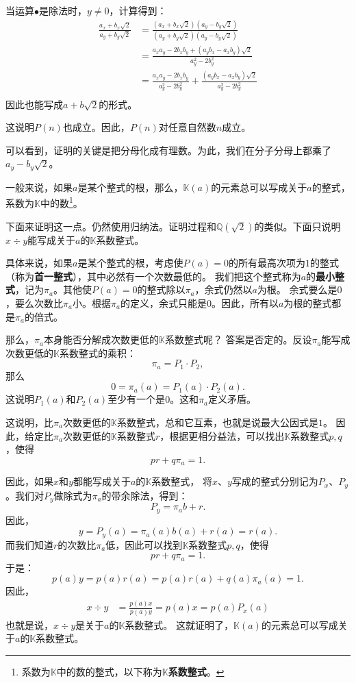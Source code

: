 \documentclass[12pt,UTF8]{ctexbook}
\theoremstyle{definition}
\theoremstyle{plain}
\begin{document}
当运算$\bullet$是除法时，$y\neq 0$，计算得到：
\begin{align*}
    \frac{a_x + b_x\sqrt{2}}{a_y + b_y\sqrt{2}} &=  \frac{(a_x + b_x\sqrt{2})(a_y - b_y\sqrt{2})}{(a_y + b_y\sqrt{2})(a_y - b_y\sqrt{2})} \\
    &= \frac{a_xa_y - 2b_xb_y + (a_yb_x - a_xb_y)\sqrt{2}}{a_y^2 - 2b_y^2} \\
    &= \frac{a_xa_y - 2b_xb_y}{a_y^2 - 2b_y^2} + \frac{(a_yb_x - a_xb_y)\sqrt{2}}{a_y^2 - 2b_y^2}\\
\end{align*}
因此也能写成$a + b\sqrt{2}$的形式。

这说明$P(n)$也成立。因此，$P(n)$对任意自然数$n$成立。

可以看到，证明的关键是把分母化成有理数。为此，我们在分子分母上都乘了$a_y - b_y\sqrt{2}$。

一般来说，如果$a$是某个整式的根，那么，$\mathbb{K}(a)$的元素总可以写成关于$a$的整式，
系数为$\mathbb{K}$中的数\footnote{系数为$\mathbb{K}$中的数的整式，以下称为$\mathbb{K}$\textbf{系数整式}。}。

下面来证明这一点。仍然使用归纳法。证明过程和$\mathbb{Q}(\sqrt{2})$的类似。下面只说明$x \div y$能写成关于$a$的$\mathbb{K}$系数整式。

具体来说，如果$a$是某个整式的根，考虑使$P(a) = 0$的所有最高次项为$1$的整式（称为\textbf{首一整式}），其中必然有一个次数最低的。
我们把这个整式称为$a$的\textbf{最小整式}，记为$\pi_a$。其他使$P(a) = 0$的整式除以$\pi_a$，余式仍然以$a$为根。
余式要么是$0$，要么次数比$\pi_a$小。根据$\pi_a$的定义，余式只能是$0$。因此，所有以$a$为根的整式都是$\pi_a$的倍式。

那么，$\pi_a$本身能否分解成次数更低的$\mathbb{K}$系数整式呢？
答案是否定的。反设$\pi_a$能写成次数更低的$\mathbb{K}$系数整式的乘积：
$$\pi_a = P_1 \cdot P_2,$$
那么
$$ 0 = \pi_a(a) = P_1(a) \cdot P_2(a).$$
这说明$P_1(a)$和$P_2(a)$至少有一个是$0$。这和$\pi_a$定义矛盾。

这说明，比$\pi_a$次数更低的$\mathbb{K}$系数整式，总和它互素，也就是说最大公因式是$1$。
因此，给定比$\pi_a$次数更低的$\mathbb{K}$系数整式$r$，根据更相分益法，可以找出$\mathbb{K}$系数整式$p,q$，使得
$$ pr + q\pi_a = 1.$$

因此，如果$x$和$y$都能写成关于$a$的$\mathbb{K}$系数整式，
将$x$、$y$写成的整式分别记为$P_x$、$P_y$。我们对$P_y$做除式为$\pi_a$的带余除法，得到：
$$ P_y = \pi_a b + r.$$
因此，
$$ y = P_y(a) = \pi_a(a) b(a) + r(a) = r(a). $$
而我们知道$r$的次数比$\pi_a$低，因此可以找到$\mathbb{K}$系数整式$p,q$，使得
$$ pr + q\pi_a = 1.$$
于是：
$$ p(a) y = p(a)r(a) = p(a)r(a) + q(a)\pi_a(a) = 1. $$
因此，
\begin{align*}
    x \div y &= \frac{p(a)x}{p(a)y} = p(a)x = p(a)P_x(a)
\end{align*}
也就是说，$x \div y$是关于$a$的$\mathbb{K}$系数整式。
这就证明了，$\mathbb{K}(a)$的元素总可以写成关于$a$的$\mathbb{K}$系数整式。
\end{document}
